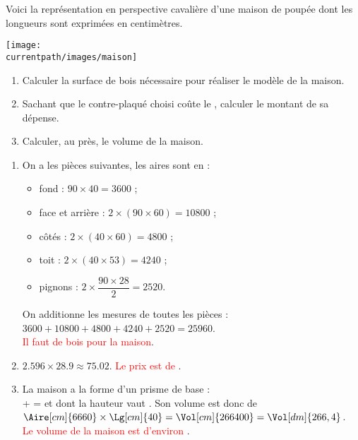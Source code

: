 \begin{exercice*} %
   Voici la représentation en perspective cavalière d'une maison de poupée dont les longueurs sont exprimées en centimètres.
   \begin{center}
      \texttt{[image: \\currentpath/images/maison]}
   \end{center}
   \vspace*{-5mm}
   \begin{enumerate}
      \item Calculer la surface de bois nécessaire pour réaliser le modèle de la maison.
      \item Sachant que le contre-plaqué choisi coûte  le \Aire[m]{}, calculer le montant de sa dépense.
      \item Calculer, au \Vol[dm]{} près, le volume de la maison.
   \end{enumerate}   
\end{exercice*}

\begin{corrige}
   \begin{enumerate}
      \item On a les pièces suivantes, les aires sont en \Aire[cm]{} :
         \begin{itemize}
            \item fond : $90\times40 =\num{3600}$ ;
            \item face et arrière : $2\times(90\times60) =\num{10800}$ ;
            \item côtés : $2\times(40\times60) =\num{4800}$ ; 
            \item toit : $2\times(40\times53) =\num{4240}$ ; \smallskip
            \item pignons : $2\times\dfrac{90\times28}{2} =\num{2520}$. \smallskip
         \end{itemize}
         On additionne les mesures de toutes les pièces : \\
         $\num{3600}+\num{10800}+\num{4800}+\num{4240}+\num{2520} =\num{25960}$. \\
         \textcolor{red}{Il faut  de bois pour la maison}.
      \item $\num{2,596}\times\num{28,9} \approx\num{75,02}$. 
      \textcolor{red}{Le prix est de \approx{}}.
      \item La maison a la forme d'un prisme de base : \\
       +  =  et dont la hauteur vaut . Son volume est donc de $\Aire[cm]{6660}\times\Lg[cm]{40} =\Vol[cm]{266400} =\Vol[dm]{266,4}$. \\
      \textcolor{red}{Le volume de la maison est d'environ }.
   \end{enumerate}   
\end{corrige}